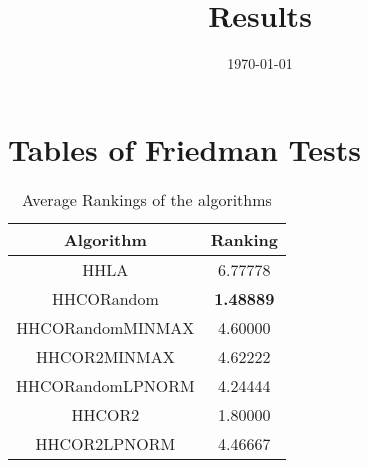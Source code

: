 \documentclass{article}
\title{Results}
\author{}
\date{\today}
\begin{document}
\oddsidemargin 0in \topmargin 0in\maketitle
\section{Tables of Friedman Tests}
\begin{table}[!htp]
\centering
\caption{Average Rankings of the algorithms
}\begin{tabular}{|c|c|}
\hline
Algorithm&Ranking\\
\hline
HHLA&6.77778\\\hline
HHCORandom& {\bf 1.48889}\\\hline
HHCORandomMINMAX&4.60000\\\hline
HHCOR2MINMAX&4.62222\\\hline
HHCORandomLPNORM&4.24444\\\hline
HHCOR2&1.80000\\\hline
HHCOR2LPNORM&4.46667\\\hline
\end{tabular}
\end{table}
\end{document}
